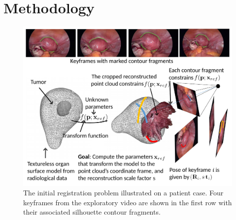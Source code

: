 





\section{Methodology}
\label{sec:ARGuidanceSystem}
\begin{figure}[t]
	\centering
	\includegraphics[width=0.95\columnwidth]{./figs/reconstructionDemoNew.pdf}
	\caption{The initial registration problem illustrated on a patient case. Four keyframes from the exploratory video are shown in the first row with their associated silhouette contour fragments.}
	\label{fig:initialRegOverview}
\end{figure}

